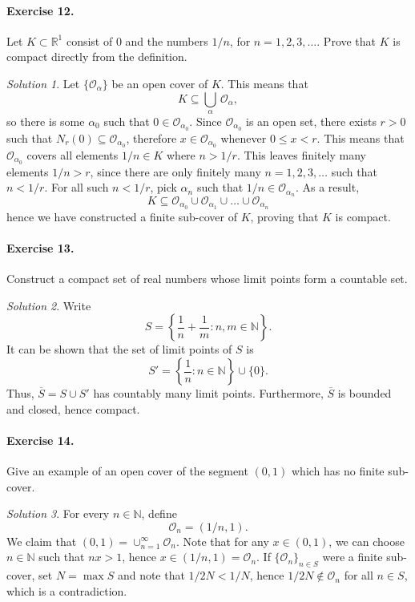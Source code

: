 \documentclass[11pt]{report}
\def\R{\mathbb{R}}
\def\N{\mathbb{N}}
\def\O{\mathscr{O}}
\theoremstyle{remark}
\newtheorem*{solution}{Solution}
\begin{document}
    \paragraph{Exercise 12.} Let $K \subset \R^1$ consist of $0$ and the numbers $1
    / n$, for $n = 1, 2, 3, \dots$. Prove that $K$ is compact directly from the
    definition.
    \begin{solution}
        Let $\{\O_\alpha\}$ be an open cover of $K$. This means that \[
            K \subseteq \bigcup_{\alpha}\, \O_\alpha,
        \] so there is some $\alpha_0$ such that $0 \in \O_{\alpha_0}$. Since
        $\O_{\alpha_0}$ is an open set, there exists $r > 0$ such that $N_r(0)
        \subseteq \O_{\alpha_0}$, therefore $x \in \O_{\alpha_0}$ whenever $0 \leq x
        < r$. This means that $\O_{\alpha_0}$ covers all elements $1 / n \in K$
        where $n > 1 / r$. This leaves finitely many elements $1 / n > r$, since there
        are only finitely many $n = 1, 2, 3, \dots$ such that $n < 1 / r$.
        For all such $n < 1 / r$, pick $\alpha_n$ such that $1 / n \in
        \O_{\alpha_n}$. As a result, \[
            K \subseteq \O_{\alpha_0} \cup \O_{\alpha_1} \cup \dots \cup
            \O_{\alpha_n}
        \] hence we have constructed a finite sub-cover of $K$, proving that $K$ is
        compact.
    \end{solution}

    \paragraph{Exercise 13.} Construct a compact set of real numbers whose limit
    points form a countable set.
    \begin{solution}
        Write \[
            S = \left\{\frac{1}{n} + \frac{1}{m} : n, m \in \N\right\}.
        \] It can be shown that the set of limit points of $S$ is \[
            S' = \left\{\frac{1}{n} : n \in \N\right\} \cup \{0\}.
        \] Thus, $\overline{S} = S \cup S'$ has countably many limit points.
        Furthermore, $\overline{S}$ is bounded and closed, hence compact.
    \end{solution}
    
    \paragraph{Exercise 14.} Give an example of an open cover of the segment $(0,
    1)$ which has no finite sub-cover.
    \begin{solution}
        For every $n \in \N$, define \[
            \O_n = (1 / n, 1).
        \] We claim that $(0, 1) = \cup_{n = 1}^\infty \O_n$. Note that for any $x
        \in (0, 1)$, we can choose $n \in \N$ such that $nx > 1$, hence $x \in (1 /
        n, 1) = \O_n$. If $\{\O_n\}_{n \in S}$ were a finite sub-cover, set $N =
        \max{S}$ and note that $1 / 2N < 1 / N$, hence $1 / 2N \notin \O_{n}$ for
        all $n \in S$, which is a contradiction.
    \end{solution}
\end{document}
